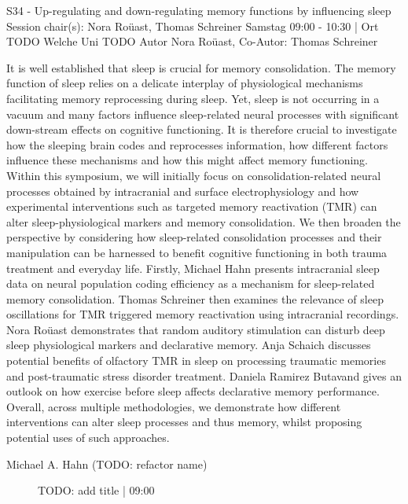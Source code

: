 
            \begin{symposium}
            {S34 - Up-regulating and down-regulating memory functions by influencing sleep}
            {Session chair(s): Nora Roüast, Thomas Schreiner}
            {Samstag 09:00 - 10:30 | Ort TODO}
            {Welche Uni TODO}
            Autor Nora Roüast, Co-Autor: Thomas Schreiner

It is well established that sleep is crucial for memory consolidation. The memory function of sleep relies on a delicate interplay of physiological mechanisms facilitating memory reprocessing during sleep. Yet, sleep is not occurring in a vacuum and many factors influence sleep-related neural processes with significant down-stream effects on cognitive functioning. It is therefore crucial to investigate how the sleeping brain codes and reprocesses information, how different factors influence these mechanisms and how this might affect memory functioning.
Within this symposium, we will initially focus on consolidation-related neural processes obtained by intracranial and surface electrophysiology and how experimental interventions such as targeted memory reactivation (TMR) can alter sleep-physiological markers and memory consolidation. We then broaden the perspective by considering how sleep-related consolidation processes and their manipulation can be harnessed to benefit cognitive functioning in both trauma treatment and everyday life.
Firstly, Michael Hahn presents intracranial sleep data on neural population coding efficiency as a mechanism for sleep-related memory consolidation. Thomas Schreiner then examines the relevance of sleep oscillations for TMR triggered memory reactivation using intracranial recordings. Nora Roüast demonstrates that random auditory stimulation can disturb deep sleep physiological markers and declarative memory. Anja Schaich discusses potential benefits of olfactory TMR in sleep on processing traumatic memories and post-traumatic stress disorder treatment. Daniela Ramirez Butavand gives an outlook on how exercise before sleep affects declarative memory performance.
Overall, across multiple methodologies, we demonstrate how different interventions can alter sleep processes and thus memory, whilst proposing potential uses of such approaches.
            \begin{description}    
            
                \item [Michael A. Hahn (TODO: refactor name)] TODO: add title \textcolor{mygray}{ | 09:00}    
                

\end{description}
\end{symposium}

